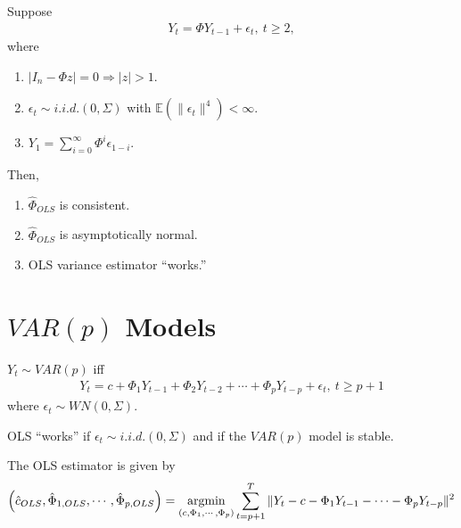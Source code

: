 \documentclass[11pt]{elegantbook}
\newcommand{\argmin}{\operatornamewithlimits{argmin}}
\begin{document}
\begin{proposition}
    Suppose
    \begin{equation}
        \begin{aligned}
            Y_t=\Phi Y_{t-1} + \epsilon_t, \ t\geq 2,
        \end{aligned}
        \nonumber
    \end{equation}
    where
    \begin{enumerate}
        \item $|I_n-\Phi z|=0 \Rightarrow |z|>1$.
        \item $\epsilon_t\sim{i.i.d.}(0,\Sigma)$ with $\mathbb{E}(\|\epsilon_t\|^4)<\infty$.
        \item $Y_1=\sum_{i=0}^\infty \Phi^i\epsilon_{1-i}$.
    \end{enumerate}
    Then,
    \begin{enumerate}
        \item $\hat{\Phi}_{OLS}$ is consistent.
        \item $\hat{\Phi}_{OLS}$ is asymptotically normal.
        \item OLS variance estimator ``works.''
    \end{enumerate}
\end{proposition}


\section{$VAR(p)$ Models}
\begin{definition}
    $Y_t\sim VAR(p)$ iff
    \begin{equation}
        \begin{aligned}
            Y_t=c+\Phi_1 Y_{t-1}+\Phi_2 Y_{t-2}+\cdots+\Phi_p Y_{t-p}+\epsilon_t,\ t\geq p+1
        \end{aligned}
        \nonumber
    \end{equation}
    where $\epsilon_t\sim WN(0,\Sigma)$.
\end{definition}
\begin{lemma}
    OLS ``works'' if $\epsilon_t\sim{i.i.d.}(0,\Sigma)$ and if the $VAR(p)$ model is stable.
\end{lemma}
The OLS estimator is given by
\begin{equation}
    \begin{aligned}
        \left(\hat{c}_{OLS},\hat{\Phi}_{1,OLS},\cdots,\hat{\Phi}_{p,OLS}\right)=\argmin_{\left(c,\Phi_1,\cdots,\Phi_p\right)} \sum_{t=p+1}^T \|Y_t-c-\Phi_1 Y_{t-1}-\cdots-\Phi_p Y_{t-p}\|^2
    \end{aligned}
    \nonumber
\end{equation}
\end{document}
